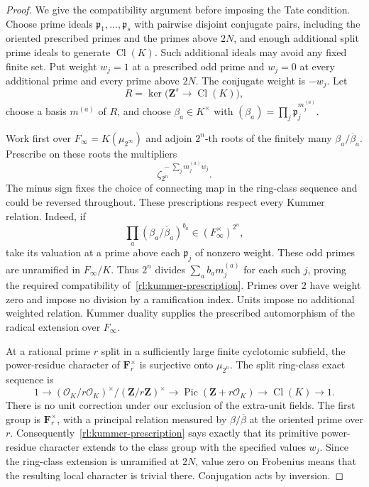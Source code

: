 \begin{proof}
We give the compatibility argument before imposing the Tate condition.
Choose prime ideals $\mathfrak p_1,\ldots,\mathfrak p_s$ with pairwise
disjoint conjugate pairs, including the oriented prescribed primes and
the primes above $2N$, and enough additional split prime ideals to
generate $\operatorname{Cl}(K)$.  Such additional ideals may avoid any
fixed finite set.  Put weight $w_j=1$ at a prescribed odd prime and
$w_j=0$ at every additional prime and every prime above $2N$.
The conjugate weight is $-w_j$.  Let
\[
 R=\ker\bigl(\mathbf Z^s\longrightarrow\operatorname{Cl}(K)\bigr),
\]
choose a basis $m^{(a)}$ of $R$, and choose $\beta_a\in K^\times$ with
$(\beta_a)=\prod_j\mathfrak p_j^{m_j^{(a)}}$.

Work first over $F_\infty=K(\mu_{2^\infty})$ and adjoin $2^n$-th roots
of the finitely many $\beta_a/\overline\beta_a$.  Prescribe on these
roots the multipliers
\begin{equation}\label{rl:kummer-prescription}
 \zeta_{2^n}^{\,-\sum_j m_j^{(a)}w_j}.
\end{equation}
The minus sign fixes the choice of connecting map in the ring-class
sequence and could be reversed throughout.  These prescriptions respect
every Kummer relation.  Indeed, if
\[
 \prod_a(\beta_a/\overline\beta_a)^{b_a}
                         \in(F_\infty^\times)^{2^n},
\]
take its valuation at a prime above each $\mathfrak p_j$ of nonzero
weight.  These odd primes are unramified in $F_\infty/K$.  Thus
$2^n$ divides $\sum_a b_am_j^{(a)}$ for each such $j$, proving the
required compatibility of~\eqref{rl:kummer-prescription}.  Primes over
$2$ have weight zero and impose no division by a ramification index.
Units impose no additional weighted relation.  Kummer duality supplies
the prescribed automorphism of the radical extension over $F_\infty$.

At a rational prime $r$ split in a sufficiently large finite cyclotomic
subfield, the power-residue character of $\mathbf F_r^\times$ is
surjective onto $\mu_{2^n}$.  The split ring-class exact sequence is
\[
 1\longrightarrow
  (\mathcal O_K/r\mathcal O_K)^\times/(\mathbf Z/r\mathbf Z)^\times
 \longrightarrow\operatorname{Pic}(\mathbf Z+r\mathcal O_K)
 \longrightarrow\operatorname{Cl}(K)\longrightarrow1.
\]
There is no unit correction under our exclusion of the extra-unit
fields.  The first group is $\mathbf F_r^\times$, with a principal
relation measured by $\beta/\overline\beta$ at the oriented prime over
$r$.  Consequently~\eqref{rl:kummer-prescription} says exactly that its
primitive power-residue character extends to the class group with the
specified values $w_j$.  Since the ring-class extension is unramified at
$2N$, value zero on Frobenius means that the resulting local character
is trivial there.  Conjugation acts by inversion.


\end{proof}
